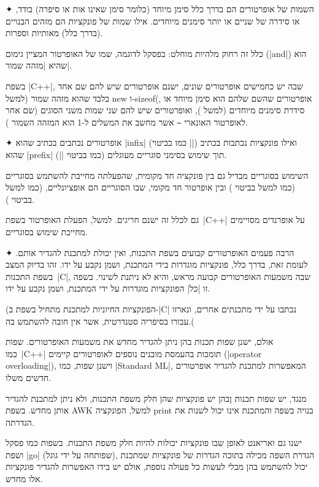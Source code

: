 \begin{enumerate}
 ✦ השמות של אופרטורים הם בדרך כלל סימן מיוחד (כלומר סימן שאינו אות או סיפרה)
 בודד, או סידרה של שניים או יותר סימנים מיוחדים. אילו שמות של פונקציות הם
 מזהים הבנויים (בדרך כלל) מאותיות וספרות.

 כלל זה רחוק מלהיות מוחלט:  בפסקל לדוגמה, שמו של האופרטור המציין גימום
 (\E|and|) הוא  שהיא \ע|מזהה שמור|.

 בשפת \E|C++|, שבה יש כחמישים אופרטורים שונים, ישנם אופרטורים שיש להם שם אחד
 בלבד שהוא מזהה שמור (למשל new ו-sizeof(, אופרטורים שהשם שלהם הוא סימן
 מיוחד או סידרת סימנים מיוחדים (למשל \cc{<==>}), ואופרטורים שיש להם שני שמות
 משני הסוגים (שם אחר לאופרטור האונארי \lstinline{~} אשר מחשב את המשלים ל-1 הוא
 המזהה השמור ).

 ✦ אופרטורים נכתבים בכתיב שהוא \E|infix| (כמו בביטוי \E||) ואילו
 פונקציות נכתבות בכתיב שהוא \E|prefix| תוך שימוש בסימני סוגריים מעוגלים (כמו
 בביטוי \E||). 

 השימוש בסוגריים מבדיל גם בין פונקציה חד מקומית, שהפעלתה מחייבת להשתמש
 בסוגריים (כמו למשל בביטוי ) ובין אופרטור חד מקומי, שבו הסוגריים
 הם אופציונליים, (כמו למשל בביטוי ).

גם לכלל זה ישנם חריגים. למשל, הפעלת האופרטור  בשפת~\E|C++| על
אופרנדים מסויימים מחייבת שימוש בסוגריים.

  ✦ הרבה פעמים האופרטורים קבועים בשפת התכנות, ואין יכולת למתכנת להגדיר אותם.
  לעומת זאת, בדרך כלל, פונקציות מוגדרות בידי המתכנת, ושמן נקבע על ידו.   זהו
  בדיוק המצב בשפת התכנות~\E|C|, שבה משמעות האופרטורים קבועה מראש, והיא לא ניתנת
  לשינוי. בשפה זו \ע|כל| הפונקציות מוגדרות על ידי המתכנת, ושמן נקבע על ידו.
 
  (הפונקציות החיוניות למתכנת מתחיל בשפת ב-\E|C| נכתבו על ידי מתכנתים אחרים,
  ונארזו עבורו בסיפריה סטנדרטית, אשר אין חובה להשתמש בה.(

  אולם, ישנן שפות תכנות בהן ניתן להגדיר מחדש את משמעות האופרטורים. שפות
  כמו~\E|C++| תומכות בהעמסת מובנים נוספים לאופרטורים קיימים (\E|operator
  overloading|), וישנן שפות, כמו \E|Standard ML|, המאפשרות למתכנת להגדיר
  אופרטורים חדשים משלו.

  מנגד, יש שפות תכנות ןבהן יש פונקציות שהן חלק משפת התכנות, ולא ניתן למתכנת
  להגדיר אותן מחדש. בשפת AWK למשל, הפונקציה print בנויה בשפה והמתכנת אינו יכול
  לשנות את הגדרתה.

  ישנו גם ואריאנט לאופן שבו פונקציות יכולות להיות חלק משפת התכנות. בשפות כמו
  פסקל ושפת \E|go| (שפותחה על ידי גוגל), הגדרת השפה מכילה בתוכה הגדרות של
  פונקציות שמתכנת יכול להשתמש בהן מבלי לעשות כל פעולה נוספת, אולם יש בידו
  האפשרות להגדיר פונקציות אלו מחדש. 
\end{enumerate}

